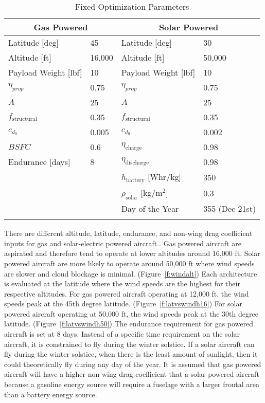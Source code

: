 \documentclass[]{aiaa-tc}%
\begin{document}
\begin{longtable}{llll}
\caption{Fixed Optimization Parameters} \\
\toprule
\toprule
\multicolumn{2}{c}{Gas Powered} & \multicolumn{2}{c}{Solar Powered}\\
\midrule
Latitude [deg]       & 45     & Latitude [deg]       & 30 \\
Altitude [ft]        & 16,000 & Altitude [ft]        & 50,000        \\
Payload Weight [lbf] & 10     & Payload Weight [lbf] & 10            \\
$\eta_{prop}$        & 0.75   & $\eta_{prop}$        & 0.75          \\
$A$                 & 25     & $A$                 & 25              \\
$f_{\text{structural}}$ & 0.35   & $f_{\text{structural}}$ & 0.35    \\
$c_{d_0}$            & 0.005  & $c_{d_0}$            & 0.002         \\ 
$BSFC$               & 0.6    & $\eta_{\text{charge}}$      & 0.98   \\
Endurance [days]     & 8      & $\eta_{\text{discharge}}$   & 0.98   \\
                     &        & $h_{\text{battery}}$ [Whr/kg]  & 350 \\
                     &        & $\rho_{\text{solar}}$ [kg/m$^2$] & 0.3 \\
                     &        & Day of the Year      & 355 (Dec 21st)\\
\bottomrule
\label{t:gassolarparams}
 \end{longtable}

There are different altitude, latitude, endurance, and non-wing drag coefficient inputs for gas and solar-electric powered aircraft.. 
Gas powered aircraft are aspirated and therefore tend to operate at lower altitudes around 16,000 ft.  
Solar powered aircraft are more likely to operate around 50,000 ft where wind speeds are slower and cloud blockage is minimal. (Figure~\ref{f:windalt})
Each architecture is evaluated at the latitude where the wind speeds are the highest for their respective altitudes.  
For gas powered aircraft operating at 12,000 ft, the wind speeds peak at the 45th degree latitude. (Figure~\ref{f:latvswindh16}) 
For solar powered aircraft operating at 50,000 ft, the wind speeds peak at the 30th degree latitude. (Figure~\ref{f:latvswindh50})
The endurance requirement for gas powered aircraft is set at 8 days. 
Instead of a specific time requirement on the solar aircraft, it is constrained to fly during the winter solstice. 
If a solar aircraft can fly during the winter solstice, when there is the least amount of sunlight, then it could theoretically fly during any day of the year.  
It is assumed that gas powered aircraft will have a higher non-wing drag coefficient that a solar powered aircraft because a gasoline energy source will require a fuselage with a larger frontal area than a battery energy source.\cite{raymer}
\end{document}

